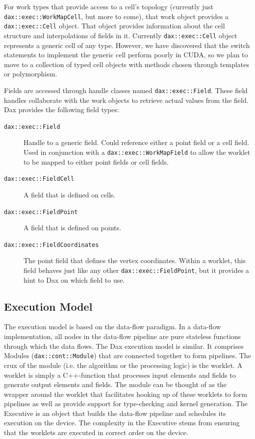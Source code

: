 \documentclass{vgtc}                          %
\newcommand*{\textC}[1]{\texttt{#1}}
\newcommand{\asterisk}{\textasteriskcentered}
\begin{document}
For work types that provide access to a cell's topology (currently just
\textC{dax::exec::WorkMapCell}, but more to come), that work object
provides a \textC{dax::exec::Cell} object.  That object provides
information about the cell structure and interpolations of fields in it.
Currently \textC{dax::exec::Cell} object represents a generic cell of any
type.  However, we have discovered that the switch statements to implement
the generic cell perform poorly in CUDA, so we plan to move to a collection
of typed cell objects with methods chosen through templates or
polymorphism.

Fields are accessed through handle classes named
\textC{dax::exec::Field\asterisk}.  These field handles collaborate with
the work objects to retrieve actual values from the field.  Dax provides
the following field types:
\begin{description}
\item[\textC{dax::exec::Field}] Handle to a generic field.  Could reference
  either a point field or a cell field.  Used in conjunction with a
  \textC{dax::exec::WorkMapField} to allow the worklet to be mapped to
  either point fields or cell fields.
\item[\textC{dax::exec::FieldCell}] A field that is defined on cells.
\item[\textC{dax::exec::FieldPoint}] A field that is defined on points.
\item[\textC{dax::exec::FieldCoordinates}] The point field that defines the
  vertex coordinates.  Within a worklet, this field behaves just like any
  other \textC{dax::exec::FieldPoint}, but it provides a hint to Dax on
  which field to use.
\end{description}


\subsection{Execution Model}
\label{sec:ExecutionModel}

The execution model is based on the data-flow paradigm. In a data-flow
implementation, all nodes in the data-flow pipeline are pure stateless functions
through which the data flows. The Dax execution model is similar. It comprises
Modules (\textC{dax::cont::Module}) that are connected together to form pipelines. The crux
of the module (i.e. the algorithm or the processing logic) is the worklet. A
worklet is simply a C++-function that processes input elements and fields to generate output
elements and fields. The module can be thought of as the wrapper around the worklet that
facilitates hooking up of these worklets to form pipelines as well as provide
support for type-checking and kernel generation. The Executive
is an object that builds the data-flow pipeline and schedules its execution on
the device. The complexity in the Executive stems from ensuring that the
worklets are executed in correct order on the device.
\end{document}
